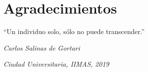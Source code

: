 
\chapter*{Agradecimientos}
\epigraph{``Un individuo solo, sólo no puede transcender.''
}{\textit{Carlos Salinas de Gortari}}
\noindent 

\noindent

\begin{flushright}
\textit{Ciudad Universitaria, IIMAS, 2019}
\end{flushright}
 



